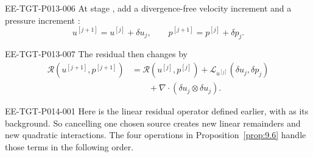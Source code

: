 \begin{EESegment}{EE-TGT-P013-006}
At stage , add a divergence-free velocity increment
 and a pressure increment
:
\[
u^{[j+1]}=u^{[j]}+\delta u_j,
\qquad
p^{[j+1]}=p^{[j]}+\delta p_j.
\]
\end{EESegment}

\begin{EESegment}{EE-TGT-P013-007}
The residual then changes by
\[
\begin{aligned}
\mathscr R(u^{[j+1]},p^{[j+1]})
  &=\mathscr R(u^{[j]},p^{[j]})+\mathcal L_{u^{[j]}}(\delta u_j,\delta p_j)\\
  &\qquad{}+\nabla\mathbin{\cdot}(\delta u_j\otimes\delta u_j).
\end{aligned}
\]
\end{EESegment}

%
\begin{EESegment}{EE-TGT-P014-001}
Here  is the linear residual operator defined earlier, with
 as its background. So cancelling one chosen source creates
new linear remainders and new quadratic interactions. The four operations in
Proposition~\ref{prop:9.6} handle those terms in the following order.
\end{EESegment}

